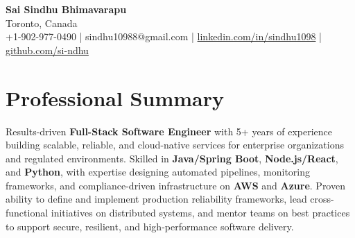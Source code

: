 \documentclass[letterpaper,11pt]{article}
\begin{document}
\begin{center}
  {\Large \textbf{Sai Sindhu Bhimavarapu}} \\
  Toronto, Canada \\
  +1-902-977-0490 \enspace | \enspace sindhu10988@gmail.com \enspace | \enspace \href{https://www.linkedin.com/in/sindhu1098/}{linkedin.com/in/sindhu1098} \enspace | \enspace \href{https://github.com/si-ndhu}{github.com/si-ndhu}
\end{center}

\section{Professional Summary}
  \begin{itemize}[leftmargin=0.15in, label={}]
    \small{\item{
     Results-driven \textbf{Full-Stack Software Engineer} with 5+ years of experience building scalable, reliable, and cloud-native services for enterprise organizations and regulated environments. Skilled in \textbf{Java/Spring Boot}, \textbf{Node.js/React}, and \textbf{Python}, with expertise designing automated pipelines, monitoring frameworks, and compliance-driven infrastructure on \textbf{AWS} and \textbf{Azure}. Proven ability to define and implement production reliability frameworks, lead cross-functional initiatives on distributed systems, and mentor teams on best practices to support secure, resilient, and high-performance software delivery.
    }}
  \end{itemize}
\vspace{-16pt}

\end{document}
